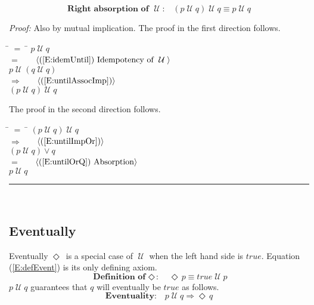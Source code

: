 \documentclass[fleqn, leqno]{article}
\newcommand{\lgap}{2pt}                             %
\newcommand{\mymathindent}{24pt}                    %
\newcommand{\impl}{\ensuremath{\Rightarrow}}        %
\newcommand{\Until}{\;\mathcal{U}\;}
\newcommand{\Event}{\Diamond\,}
\newcommand{\myqed}{\hfill\rule[-.23ex]{1.2ex}{2.0ex}}
\newcommand{\Gll} {\langle}                         %
\newcommand{\Ggg} {\rangle}                         %
\newcommand{\Hint}[1]     {\ \ \ $\Gll              \mbox{#1} \Ggg$ }   %
\begin{document}
\begin{equation}\label{E:untilIdemR}
\textbf{Right absorption of $\Until$:}\quad (p \Until q) \Until q \equiv p \Until q
\end{equation}

\emph{Proof:} Also by mutual implication.
The proof in the first direction follows.
\begin{tabbing}
\hspace{\mymathindent} \= $= \;$ \= \kill
  \> \>   $p \Until q$\\[\lgap]
  \> $=$  \>  \Hint{(\ref{E:idemUntil}) Idempotency of $\Until$}\\[\lgap]
  \> \>   $p \Until (q \Until q)$\\[\lgap]
  \> $\impl$  \>  \Hint{(\ref{E:untilAssocImp})}\\[\lgap]
  \> \>   $(p \Until q) \Until q$
\end{tabbing}

The proof in the second direction follows.
\begin{tabbing}
\hspace{\mymathindent} \= $= \;$ \= \kill
  \> \>   $(p \Until q) \Until q$\\[\lgap]
  \> $\impl$  \>  \Hint{(\ref{E:untilImpOr})}\\[\lgap]
  \> \>   $(p \Until q) \lor q$\\[\lgap]
  \> $=$  \>  \Hint{(\ref{E:untilOrQ}) Absorption}\\[\lgap]
  \> \>   $p \Until q$
\end{tabbing}
\myqed\\[\lgap]

\subsection{Eventually}

Eventually $\Event$ is a special case of $\Until$ when the left hand side is $true$.
Equation (\ref{E:defEvent}) is its only defining axiom.
\begin{equation}\label{E:defEvent}
\textbf{Definition of $\Event$:}\quad \Event p \equiv true \Until p
\end{equation}
$p\Until q$ guarantees that $q$ will eventually be $true$ as follows.
\begin{equation}\label{E:eventuality}
\textbf{Eventuality:}\quad p \Until q \impl \Event q
\end{equation}
\end{document}
